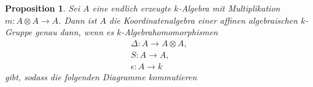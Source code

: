 \documentclass[a4paper, 11pt]{scrartcl}
\newcommand{\id}{\text{id}}
\theoremstyle{basicstyle}
\newtheorem{proposition}[definition]{Proposition}
\begin{document}
    \begin{proposition}\label{prop:1}
        Sei \(A\) eine endlich erzeugte \(k\)-Algebra mit Multiplikation \(m: A \otimes A \to A\).
        Dann ist \(A\) die Koordinatenalgebra einer affinen algebraischen \(k\)-Gruppe genau dann, wenn es \(k\)-Algebrahomomorphismen
        \begin{gather*}
            \Delta: A \longrightarrow A \otimes A, \\
            S: A \longrightarrow A, \\
            \epsilon: A \longrightarrow k
        \end{gather*}
        gibt, sodass die folgenden Diagramme kommutieren
        \begin{figure*}[ht!]
            \centering
        \end{figure*}
        \begin{figure*}[ht!]
            \centering
            \hspace*{4em}
        \end{figure*}
        \begin{figure*}[ht!]
            \centering
            \hspace*{4em}
        \end{figure*}
    \end{proposition}
\end{document}
